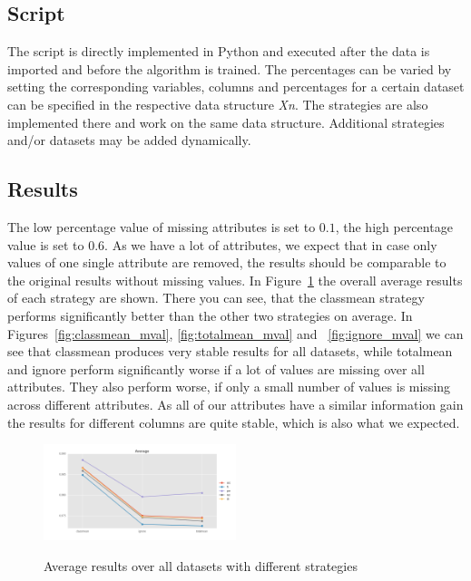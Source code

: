 \documentclass{sig-alternate-05-2015}
\begin{document}
\subsection{Script}

The script is directly implemented in Python and executed after the data is imported and before the algorithm is trained.
The percentages can be varied by setting the corresponding variables, columns and percentages for a certain dataset can be specified in the respective data structure \emph{Xn}.
The strategies are also implemented there and work on the same data structure.
Additional strategies and/or datasets may be added dynamically.

\subsection{Results}

The low percentage value of missing attributes is set to $0.1$, the high percentage value is set to $0.6$.
As we have a lot of attributes, we expect that in case only values of one single attribute are removed, the results should be comparable to the original results without missing values.
In Figure~\ref{fig:average_mval} the overall average results of each strategy are shown.
There you can see, that the classmean strategy performs significantly better than the other two strategies on average.
In Figures~\ref{fig:classmean_mval}, \ref{fig:totalmean_mval} and ~\ref{fig:ignore_mval} we can see that classmean produces very stable results for all datasets, while totalmean and ignore perform significantly worse if a lot of values are missing over all attributes.
They also perform worse, if only a small number of values is missing across different attributes.
As all of our attributes have a similar information gain the results for different columns are quite stable, which is also what we expected.

\begin{figure}[h]
  \centering
  \caption{Average results over all datasets with different strategies}
  \includegraphics[width=0.5\textwidth]{../plots/average_missing_values}
  \label{fig:average_mval}
\end{figure}
\end{document}
